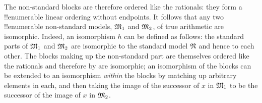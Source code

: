 \documentclass[../../include/open-logic-section]{subfiles}
\begin{document}
The non-standard blocks  are therefore ordered like the rationals:
they form a !!{enumerable} linear ordering without endpoints.  It follows
that any two !!{enumerable} non-standard models, $\mathfrak M_1$ and
$\mathfrak M_2$, of true arithmetic are isomorphic. Indeed, an
isomorphism $h$ can be defined as follows: the standard parts
of $\mathfrak M_1$ and $\mathfrak M_2$ are isomorphic to the standard
model $\mathfrak N$ and hence to each other. The blocks making up
the non-standard part are themselves ordered like the rationals and
therefore by  are isomorphic; an isomorphism
of the blocks can be extended to an isomorphism \emph{within} the
blocks by matching up arbitrary elements in each, and then taking the
image of the successor of $x$ in $\mathfrak M_1$ to be the successor
of the image of $x$ in $\mathfrak M_2$.
\end{document}

